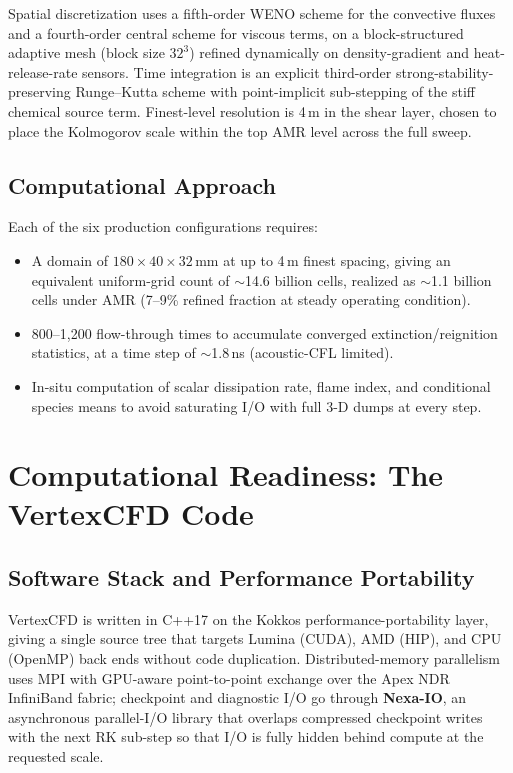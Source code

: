 \documentclass[11pt,a4paper]{scrartcl}
\begin{document}
Spatial discretization uses a fifth-order WENO scheme for the convective fluxes and a fourth-order central scheme for viscous terms, on a block-structured adaptive mesh (block size $32^3$) refined dynamically on density-gradient and heat-release-rate sensors. Time integration is an explicit third-order strong-stability-preserving Runge--Kutta scheme with point-implicit sub-stepping of the stiff chemical source term. Finest-level resolution is 4\,\textmu m in the shear layer, chosen to place the Kolmogorov scale within the top AMR level across the full sweep.

\subsection{Computational Approach}
Each of the six production configurations requires:
\begin{itemize}[leftmargin=16pt,itemsep=2pt]
  \item A domain of $180 \times 40 \times 32$\,mm at up to 4\,\textmu m finest spacing, giving an equivalent uniform-grid count of $\sim$14.6 billion cells, realized as $\sim$1.1 billion cells under AMR (7--9\% refined fraction at steady operating condition).
  \item 800--1{,}200 flow-through times to accumulate converged extinction/reignition statistics, at a time step of $\sim$1.8\,ns (acoustic-CFL limited).
  \item In-situ computation of scalar dissipation rate, flame index, and conditional species means to avoid saturating I/O with full 3-D dumps at every step.
\end{itemize}

\section{Computational Readiness: The VertexCFD Code}

\subsection{Software Stack and Performance Portability}
VertexCFD is written in C++17 on the Kokkos performance-portability layer, giving a single source tree that targets Lumina (CUDA), AMD (HIP), and CPU (OpenMP) back ends without code duplication. Distributed-memory parallelism uses MPI with GPU-aware point-to-point exchange over the Apex NDR InfiniBand fabric; checkpoint and diagnostic I/O go through \textbf{Nexa-IO}, an asynchronous parallel-I/O library that overlaps compressed checkpoint writes with the next RK sub-step so that I/O is fully hidden behind compute at the requested scale.
\end{document}
